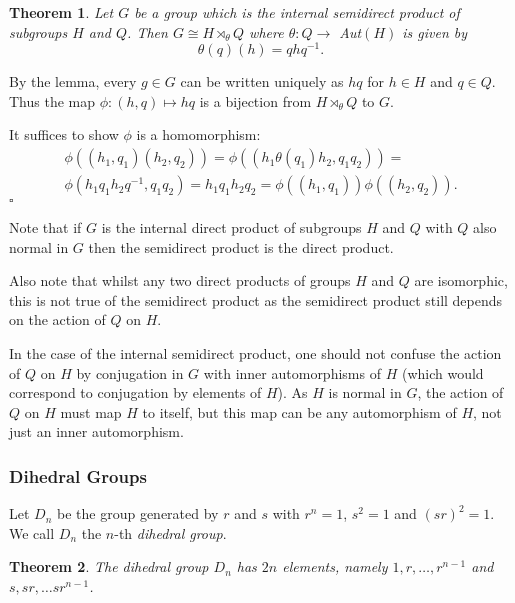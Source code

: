 \documentclass[10pt]{article}
\newtheorem{theorem}{Theorem}[section]
\newenvironment{proof}[1][Proof]{\begin{trivlist}
\item[\hskip \labelsep {\itshape #1}]}{\end{trivlist}}
\newenvironment{definition}[1][Definition]{\begin{trivlist}
\item[\hskip \labelsep {\bfseries #1}]}{\end{trivlist}}
\begin{document}
\begin{theorem}
Let $G$ be a group which is the internal semidirect product of subgroups $H$ and $Q$. Then $G \cong H\rtimes_{\theta} Q$ where $\theta : Q \to$ Aut$(H)$ is given by
$$\theta(q)(h) = qhq^{-1}.$$
\end{theorem}

\begin{proof}
By the lemma, every $g \in G$ can be written uniquely as $hq$ for $h \in H$ and $q \in Q$. Thus the map $\phi : (h, q) \mapsto hq$ is a bijection from $H\rtimes_{\theta} Q$ to $G$.

It suffices to show $\phi$ is a homomorphism:
\begin{multline*}
\phi((h_1, q_1)(h_2, q_2)) = \phi((h_1\theta(q_1)h_2, q_1q_2)) =\\
\phi(h_1q_1h_2q^{-1}, q_1q_2) = h_1q_1h_2q_2 = \phi((h_1, q_1))\phi((h_2, q_2)).
\end{multline*} $\square$
\end{proof}

Note that if $G$ is the internal direct product of subgroups $H$ and $Q$ with $Q$ also normal in $G$ then the semidirect product is the direct product.

Also note that whilst any two direct products of groups $H$ and $Q$ are isomorphic, this is not true of the semidirect product as the semidirect product still depends on the action of $Q$ on $H$.

In the case of the internal semidirect product, one should not confuse the action of $Q$ on $H$ by conjugation in $G$ with inner automorphisms of $H$ (which would correspond to conjugation by elements of $H$). As $H$ is normal in $G$, the action of $Q$ on $H$ must map $H$ to itself, but this map can be any automorphism of $H$, not just an inner automorphism.

\subsubsection{Dihedral Groups}

\begin{definition}
Let $D_n$ be the group generated by $r$ and $s$ with $r^n = 1$, $s^2 = 1$ and $(sr)^2 = 1$. We call $D_n$ the $n$-th \emph{dihedral group}.
\end{definition}

\begin{theorem}
The dihedral group $D_n$ has $2n$ elements, namely $1, r, \ldots, r^{n-1}$ and $s, sr, \ldots sr^{n-1}$.
\end{theorem}
\end{document}
